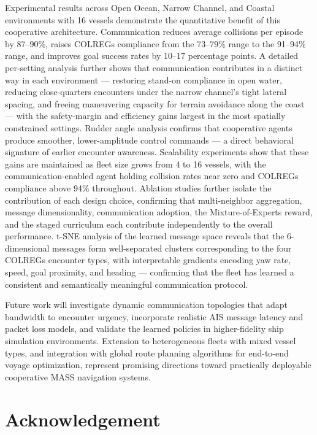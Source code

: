 \documentclass[final,5p,times,twocolumn]{elsarticle}
\begin{document}
{Experimental results across Open Ocean, Narrow Channel, and Coastal environments with 16 vessels demonstrate the quantitative benefit of this cooperative architecture. Communication reduces average collisions per episode by 87--90\%, raises COLREGs compliance from the 73--79\% range to the 91--94\% range, and improves goal success rates by 10--17 percentage points. A detailed per-setting analysis further shows that communication contributes in a distinct way in each environment --- restoring stand-on compliance in open water, reducing close-quarters encounters under the narrow channel's tight lateral spacing, and freeing maneuvering capacity for terrain avoidance along the coast --- with the safety-margin and efficiency gains largest in the most spatially constrained settings. Rudder angle analysis confirms that cooperative agents produce smoother, lower-amplitude control commands --- a direct behavioral signature of earlier encounter awareness. Scalability experiments show that these gains are maintained as fleet size grows from 4 to 16 vessels, with the communication-enabled agent holding collision rates near zero and COLREGs compliance above 94\% throughout. Ablation studies further isolate the contribution of each design choice, confirming that multi-neighbor aggregation, message dimensionality, communication adoption, the Mixture-of-Experts reward, and the staged curriculum each contribute independently to the overall performance. t-SNE analysis of the learned message space reveals that the 6-dimensional messages form well-separated clusters corresponding to the four COLREGs encounter types, with interpretable gradients encoding yaw rate, speed, goal proximity, and heading --- confirming that the fleet has learned a consistent and semantically meaningful communication protocol.

Future work will investigate dynamic communication topologies that adapt bandwidth to encounter urgency, incorporate realistic AIS message latency and packet loss models, and validate the learned policies in higher-fidelity ship simulation environments. Extension to heterogeneous fleets with mixed vessel types, and integration with global route planning algorithms for end-to-end voyage optimization, represent promising directions toward practically deployable cooperative MASS navigation systems.
}

\section*{Acknowledgement}
\end{document}
